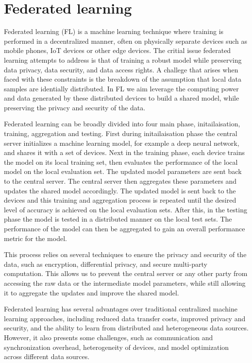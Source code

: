 \section{Federated learning}


Federated learning (FL) \cite{FederatedLearning} is a machine learning technique where training is performed in a decentralized manner, often on physically separate devices such as mobile phones, IoT devices or other edge devices. 
The critial issue federated learning attempts to address is that of training a robust model while preserving data privacy, data security, and data access rights.
A challege that arises when faced with these constraints is the breakdown of the assumption that local data samples are identially distributed.
In FL we aim leverage the computing power and data generated by these distributed devices to build a shared model, while preserving the privacy and security of the data.

Federated learning can be broadly divided into four main phase, initailaisation, training, aggregation and testing. 
First during initailaisation phase the central server initializes a machine learning model, for example a deep neural network, and shares it with a set of devices. 
Next in the training phase, each device trains the model on its local training set, then evaluates the performance of the local model on the local evaluation set. 
The updated model parameters are sent back to the central server. 
The central server then aggregates these parameters and updates the shared model accordingly.
The updated model is sent back to the devices and this training and aggregation process is repeated until the desired level of accuracy is achieved on the local evaluation sets.
After this, in the testing phase the model is tested in a distributed manner on the local test sets. The performance of the model can then be aggregated to gain an overall performance metric for the model.

This process relies on several techniques to ensure the privacy and security of the data, such as encryption, differential privacy, and secure multi-party computation. This allows us to prevent the central server or any other party from accessing the raw data or the intermediate model parameters, while still allowing it to aggregate the updates and improve the shared model.

Federated learning has several advantages over traditional centralized machine learning approaches, including reduced data transfer costs, improved privacy and security, and the ability to learn from distributed and heterogeneous data sources. However, it also presents some challenges, such as communication and synchronization overhead, heterogeneity of devices, and model optimization across different data sources.

